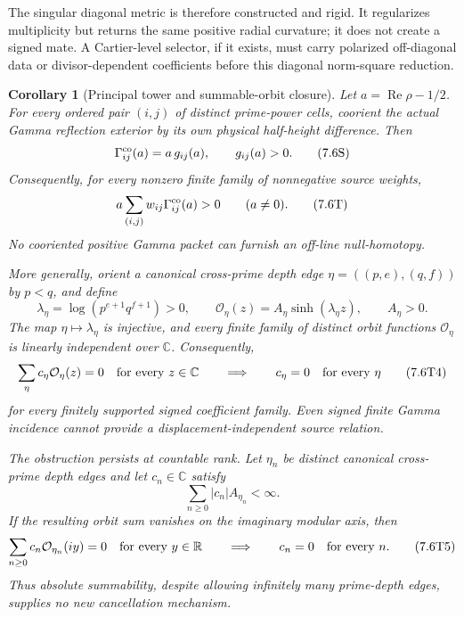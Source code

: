 \documentclass[11pt]{article}
\newtheorem{corollary}[theorem]{Corollary}
\theoremstyle{definition}
\theoremstyle{remark}
\newcommand{\C}{\mathbb C}
\newcommand{\R}{\mathbb R}
\newcommand{\Rea}{\operatorname{Re}}
\begin{document}
The singular diagonal metric is therefore constructed and rigid.  It
regularizes multiplicity but returns the same positive radial curvature; it
does not create a signed mate.  A Cartier-level selector, if it exists, must
carry polarized off-diagonal data or divisor-dependent coefficients before
this diagonal norm-square reduction.

\begin{corollary}[Principal tower and summable-orbit closure]
\label{cor:principal-gauge-closure}
Let \(a=\Rea\rho-1/2\).  For every ordered pair \((i,j)\) of distinct
prime-power cells, coorient the actual Gamma reflection exterior by its own
physical half-height difference.  Then
\[
             \Gamma^{\rm co}_{ij}(a)=a\,g_{ij}(a),
             \qquad g_{ij}(a)>0.
\tag{7.6S}\label{eq:gamma-positive-principal-gauge}
\]
Consequently, for every nonzero finite family of nonnegative source weights,
\[
 a\sum_{(i,j)}w_{ij}\Gamma^{\rm co}_{ij}(a)>0
 \qquad(a\ne0).
\tag{7.6T}\label{eq:gamma-positive-cone-no-shorting}
\]
No cooriented positive Gamma packet can furnish an off-line null-homotopy.

More generally, orient a canonical cross-prime depth edge
\(\eta=((p,e),(q,f))\) by \(p<q\), and define
\[
 \lambda_\eta=\log\!\left(p^{e+1}q^{f+1}\right)>0,\qquad
 \mathcal O_\eta(z)=A_\eta\sinh(\lambda_\eta z),\qquad A_\eta>0.
\tag{7.6T3}\label{eq:gamma-complex-orbit}
\]
The map \(\eta\mapsto\lambda_\eta\) is injective, and every finite family of
distinct orbit functions \(\mathcal O_\eta\) is linearly independent over
\(\C\).  Consequently,
\[
 \sum_\eta c_\eta\mathcal O_\eta(z)=0\quad\hbox{for every }z\in\C
 \qquad\Longrightarrow\qquad c_\eta=0\quad\hbox{for every }\eta
\tag{7.6T4}\label{eq:gamma-signed-finite-orbit-no-shorting}
\]
for every finitely supported signed coefficient family.  Even signed finite
Gamma incidence cannot provide a displacement-independent source relation.

The obstruction persists at countable rank.  Let
\(\eta_n\) be distinct canonical cross-prime depth edges and let
\(c_n\in\C\) satisfy
\[
             \sum_{n\ge0}|c_n|A_{\eta_n}<\infty.
\]
If the resulting orbit sum vanishes on the imaginary modular axis, then
\[
 \sum_{n\ge0}c_n\mathcal O_{\eta_n}(iy)=0
 \quad\hbox{for every }y\in\R
 \qquad\Longrightarrow\qquad c_n=0\quad\hbox{for every }n.
\tag{7.6T5}\label{eq:gamma-signed-summable-orbit-no-shorting}
\]
Thus absolute summability, despite allowing infinitely many prime-depth
edges, supplies no new cancellation mechanism.


\end{corollary}
\end{document}

